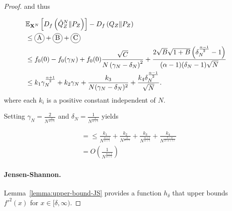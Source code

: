 \begin{proof}
and thus

\begin{align*}
    &\E_{\XN} \left[ D_f\left( \hat{Q}_Z^N \| P_Z\right)\right] - D_f\left( Q_{Z} \| P_Z\right)\\
    &\leq \encircle{A} + \encircle{B} + \encircle{C} \\
    &\leq f_0(0) - f_0(\gamma_N) + f_0(0) \frac{\sqrt{C}}{N \left( \gamma_N - \delta_N \right)^2} + \frac{2\sqrt{B}\sqrt{1+B}\left(\delta_N^\frac{\alpha-1}{2} - 1\right)}{(\alpha - 1) (\delta_N- 1) \sqrt{N}}\\
    &\leq k_1 \gamma_N^{\frac{\alpha+1}{2}} + k_2 \gamma_N + \frac{k_3}{N(\gamma_N - \delta_N)^2} + \frac{k_4 \delta_N^\frac{\alpha-1}{2}}{\sqrt{N}}.
\end{align*}
where each $k_i$ is a positive constant independent of $N$.

Setting $\gamma_N = \frac{2}{N^\frac{2}{\alpha+5}}$ and $\delta_N = \frac{1}{N^\frac{2}{\alpha+5}}$ yields

\begin{align*}
    &= \leq  \frac{k_1}{N^{\frac{\alpha+1}{\alpha+5}}} + \frac{k_2}{N^{\frac{2}{\alpha+5}}}
    + \frac{k_3}{N^{\frac{\alpha+1}{\alpha+5}}} 
    + \frac{k_4}{N^{\frac{7-\alpha}{2(\alpha+5)}}} \\
    & = O\left(\frac{1}{N^\frac{\alpha+1}{\alpha+5}} \right)
\end{align*}


\paragraph{Jensen-Shannon.}
Lemma~\ref{lemma:upper-bound-JS} provides a function $h_\delta$ that upper bounds $f'^2(x)$ for $x \in[\delta, \infty)$.


\end{proof}
